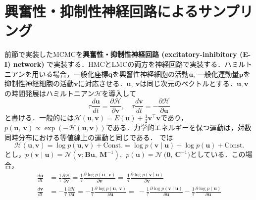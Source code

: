 \section{興奮性・抑制性神経回路によるサンプリング}
前節で実装したMCMCを\textbf{興奮性・抑制性神経回路 (excitatory-inhibitory (E-I) network)} で実装する．HMCとLMCの両方を神経回路で実装する．ハミルトニアンを用いる場合，一般化座標$\mathbf{q}$を興奮性神経細胞の活動$\mathbf{u}$, 一般化運動量$\mathbf{p}$を抑制性神経細胞の活動$\mathbf{v}$に対応させる．$\mathbf{u,\ v}$は同じ次元のベクトルとする．$\mathbf{u}, \mathbf{v}$の時間発展はハミルトニアン$\mathcal{H}$を導入して
\begin{equation}
\tau\frac{d\mathbf{u}}{dt} = \frac{\partial \mathcal{H}}{\partial\mathbf{v}},\quad\tau\frac{d\mathbf{v}}{dt} = - \frac{\partial \mathcal{H}}{\partial\mathbf{u}}
\end{equation}
と書ける．一般的には$\mathcal{H}(\mathbf{u}, \mathbf{v}) = E\left( \mathbf{u} \right) + \frac{1}{2}\mathbf{v}^{\top}\mathbf{v}$であり，$p\left( \mathbf{u},\ \mathbf{v} \right) \propto \exp( - \mathcal{H}(\mathbf{u,v}))$である．力学的エネルギーを保つ運動は，対数同時分布における等値線上の運動と同じである．
\citep{Aitchison2016-xu}では
\begin{equation}
\mathcal{H}(\mathbf{u}, \mathbf{v}) = \log p \left(\mathbf{u}, \mathbf{v} \right) + \textrm{Const.} = \log p \left(\mathbf{v} \middle| \mathbf{u} \right) + \log p\left(\mathbf{u} \right) + \textrm{Const.}
\end{equation}
とし，$p\left( \mathbf{v} \middle| \mathbf{u} \right)\mathcal{= N}\left( \mathbf{v};\mathbf{Bu},\ \mathbf{M}^{- 1} \right),\ \ p\left( \mathbf{u} \right) = \mathcal{N\ (}\mathbf{0},\ \mathbf{C}^{- 1})$としている．この場合，
\begin{align}
\frac{d\mathbf{u}}{dt} &= \frac{1}{\tau}\frac{\partial \mathcal{H}}{\partial\mathbf{v}} = \frac{1}{\tau}\frac{\partial\log{p\left( \mathbf{u},\ \mathbf{v} \right)}}{\partial\mathbf{v}} = \ \frac{1}{\tau}\frac{\partial\log{p\left( \mathbf{v} \middle| \mathbf{u} \right)}}{\partial\mathbf{v}}\\
\frac{d\mathbf{v}}{dt} &= - \frac{1}{\tau}\frac{\partial \mathcal{H}}{\partial\mathbf{u}} = - \frac{1}{\tau}\frac{\partial\log{p\left( \mathbf{u},\ \mathbf{v} \right)}}{\partial\mathbf{u}} = \  - \frac{1}{\tau}\frac{\partial\log{p\left( \mathbf{v} \middle| \mathbf{u} \right)}}{\partial\mathbf{u}} - \frac{1}{\tau}\frac{\partial\log{p\left( \mathbf{u} \right)}}{\partial\mathbf{u}}
\end{align}
